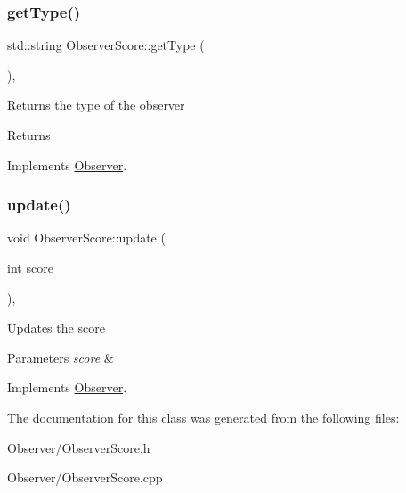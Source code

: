 \subsubsection{\texorpdfstring{get\+Type()}{getType()}}
{\footnotesize\ttfamily std\+::string Observer\+Score\+::get\+Type (\begin{DoxyParamCaption}{ }\end{DoxyParamCaption})\hspace{0.3cm}{\ttfamily [override]}, {\ttfamily [virtual]}}

Returns the type of the observer \begin{DoxyReturn}{Returns}

\end{DoxyReturn}


Implements \hyperlink{classObserver_a92f704d0a3e6e0ade2743da2ae91bcb7}{Observer}.

\mbox{\label{classObserverScore_a1cb10ae5056c103436e00158cf90d5e4}} 
\subsubsection{\texorpdfstring{update()}{update()}}
{\footnotesize\ttfamily void Observer\+Score\+::update (\begin{DoxyParamCaption}\item[{int}]{score }\end{DoxyParamCaption})\hspace{0.3cm}{\ttfamily [override]}, {\ttfamily [virtual]}}

Updates the score 
\begin{DoxyParams}{Parameters}
{\em score} & \\
\hline
\end{DoxyParams}


Implements \hyperlink{classObserver_a4b9e6fbc74e7ae6971b2afe462ab5a87}{Observer}.



The documentation for this class was generated from the following files\+:\begin{DoxyCompactItemize}
\item 
Observer/Observer\+Score.\+h\item 
Observer/Observer\+Score.\+cpp\end{DoxyCompactItemize}
